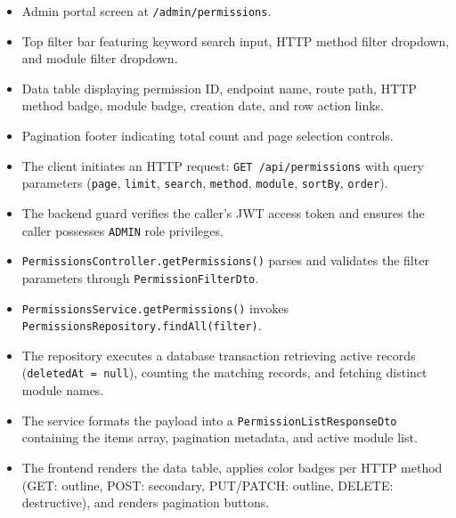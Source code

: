 \begin{itemize}[leftmargin=1.6em,topsep=3pt,itemsep=2pt,parsep=0pt,label=$\bullet$]
    \item Admin portal screen at \texttt{/admin/permissions}.
    \item Top filter bar featuring keyword search input, HTTP method filter dropdown, and module filter dropdown.
    \item Data table displaying permission ID, endpoint name, route path, HTTP method badge, module badge, creation date, and row action links.
    \item Pagination footer indicating total count and page selection controls.
\end{itemize}

\begin{itemize}[leftmargin=1.6em,topsep=3pt,itemsep=2pt,parsep=0pt,label=$\bullet$]
    \item The client initiates an HTTP request: \texttt{GET /api/permissions} with query parameters (\texttt{page}, \texttt{limit}, \texttt{search}, \texttt{method}, \texttt{module}, \texttt{sortBy}, \texttt{order}).
    \item The backend guard verifies the caller's JWT access token and ensures the caller possesses \texttt{ADMIN} role privileges.
    \item \texttt{Permissions\allowbreak{}Controller.\allowbreak{}getPermissions()} parses and validates the filter parameters through \texttt{Permission\allowbreak{}Filter\allowbreak{}Dto}.
    \item \texttt{Permissions\allowbreak{}Service.\allowbreak{}getPermissions()} invokes \texttt{Permissions\allowbreak{}Repository.\allowbreak{}findAll(\allowbreak{}filter)}.
    \item The repository executes a database transaction retrieving active records (\texttt{deletedAt = null}), counting the matching records, and fetching distinct module names.
    \item The service formats the payload into a \texttt{Permission\allowbreak{}List\allowbreak{}Response\allowbreak{}Dto} containing the items array, pagination metadata, and active module list.
    \item The frontend renders the data table, applies color badges per HTTP method (GET: outline, POST: secondary, PUT/PATCH: outline, DELETE: destructive), and renders pagination buttons.
\end{itemize}

